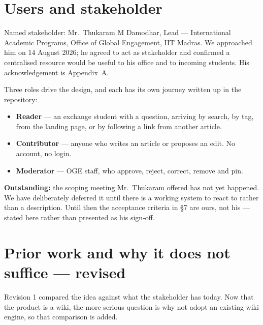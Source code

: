 \documentclass[11pt]{article}
\begin{document}
\section{Users and stakeholder}

Named stakeholder: Mr.\ Thukaram M Damodhar, Lead --- International Academic Programs, Office of
Global Engagement, IIT Madras. We approached him on 14 August 2026; he agreed to act as stakeholder
and confirmed a centralised resource would be useful to his office and to incoming students. His
acknowledgement is Appendix~A.

Three roles drive the design, and each has its own journey written up in the repository:

\begin{itemize}
  \item \textbf{Reader} --- an exchange student with a question, arriving by search, by tag, from the
        landing page, or by following a link from another article.
  \item \textbf{Contributor} --- anyone who writes an article or proposes an edit. No account, no
        login.
  \item \textbf{Moderator} --- OGE staff, who approve, reject, correct, remove and pin.
\end{itemize}

\textbf{Outstanding:} the scoping meeting Mr.\ Thukaram offered has not yet happened. We have
deliberately deferred it until there is a working system to react to rather than a description.
Until then the acceptance criteria in \S7 are ours, not his --- stated here rather than presented as
his sign-off.

\section{Prior work and why it does not suffice --- revised}

Revision 1 compared the idea against what the stakeholder has today. Now that the product is a wiki,
the more serious question is why not adopt an existing wiki engine, so that comparison is added.
\end{document}
